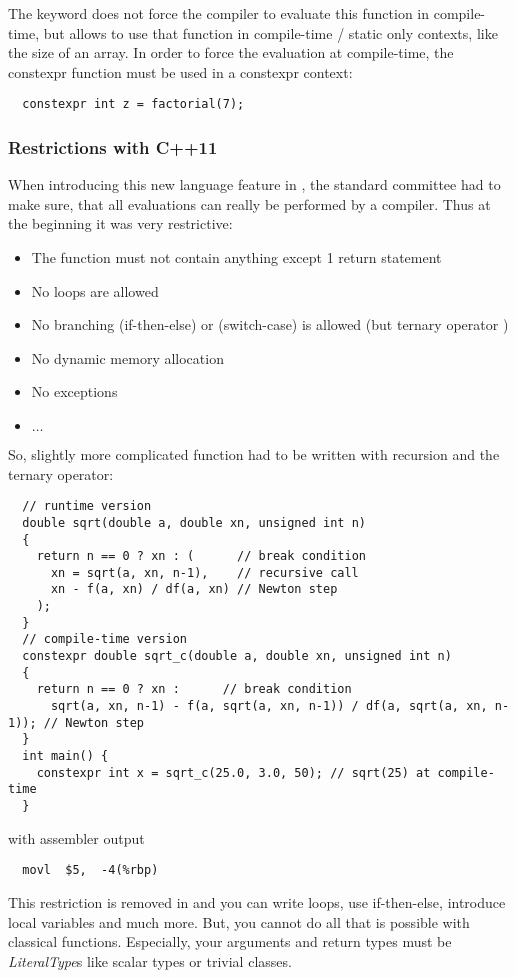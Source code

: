 The keyword  does not force the compiler to evaluate this function in compile-time, but allows to use that function in
compile-time / static only contexts, like the size of an array. In order to force the evaluation at compile-time, the constexpr function
must be used in a constexpr context:
\begin{verbatim}
  constexpr int z = factorial(7);
\end{verbatim}

\subsubsection{Restrictions with C++11}
When introducing this new language feature in , the standard committee had to make sure, that all evaluations can really be performed
by a compiler. Thus at the beginning it was very restrictive:
\begin{itemize}
  \item The function must not contain anything except 1 return statement
  \item No loops are allowed
  \item No branching (if-then-else) or (switch-case) is allowed (but ternary operator )
  \item No dynamic memory allocation
  \item No exceptions
  \item $\ldots$
\end{itemize}

So, slightly more complicated function had to be written with recursion and the ternary operator:
%
\begin{verbatim}
  // runtime version
  double sqrt(double a, double xn, unsigned int n)
  {
    return n == 0 ? xn : (      // break condition
      xn = sqrt(a, xn, n-1),    // recursive call
      xn - f(a, xn) / df(a, xn) // Newton step
    );
  }
  // compile-time version
  constexpr double sqrt_c(double a, double xn, unsigned int n)
  {
    return n == 0 ? xn :      // break condition
      sqrt(a, xn, n-1) - f(a, sqrt(a, xn, n-1)) / df(a, sqrt(a, xn, n-1)); // Newton step
  }
  int main() {
    constexpr int x = sqrt_c(25.0, 3.0, 50); // sqrt(25) at compile-time
  }
\end{verbatim}
%
with assembler output
\begin{verbatim}
  movl  $5,  -4(%rbp)
\end{verbatim}

This restriction is removed in  and you can write loops, use if-then-else, introduce local variables and much more. But, you cannot do
all that is possible with classical functions. Especially, your arguments and return types must be \emph{LiteralType}s like scalar types or
trivial classes.


